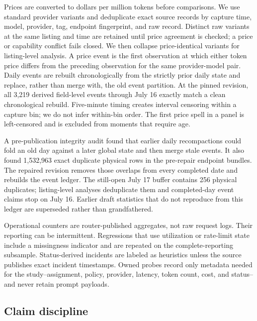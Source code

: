 \documentclass[11pt]{article}
\newcommand{\1}{\mathbf{1}}
\begin{document}
Prices are converted to dollars per million tokens before comparisons.  We use
standard provider variants and deduplicate exact source records by capture time,
model, provider, tag, endpoint fingerprint, and raw record.  Distinct raw variants
at the same listing and time are retained until price agreement is checked; a
price or capability conflict fails closed.  We then collapse price-identical
variants for listing-level analysis.  A price event is the first observation at
which either token price differs from the preceding observation for the same
provider-model pair.  Daily events are rebuilt chronologically from the strictly
prior daily state and replace, rather than merge with, the old event partition.
At the pinned revision, all 3,219 derived field-level events through July 16
exactly match a clean chronological rebuild.  Five-minute timing creates interval
censoring within a capture bin; we do not infer within-bin order.  The first price
spell in a panel is left-censored and is excluded from moments that require age.

A pre-publication integrity audit found that earlier daily recompactions could
fold an old day against a later global state and then merge stale events.  It also
found 1,532,963 exact duplicate physical rows in the pre-repair endpoint bundles.
The repaired revision removes those overlaps from every completed date and
rebuilds the event ledger.  The still-open July 17 buffer contains 256 physical
duplicates; listing-level analyses deduplicate them and completed-day event
claims stop on July 16.  Earlier draft statistics that do not reproduce from this
ledger are superseded rather than grandfathered.

Operational counters are router-published aggregates, not raw request logs.
Their reporting can be intermittent.  Regressions that use utilization or
rate-limit state include a missingness indicator and are repeated on the
complete-reporting subsample.  Status-derived incidents are labeled as heuristics
unless the source publishes exact incident timestamps.  Owned probes record only
metadata needed for the study--assignment, policy, provider, latency, token count,
cost, and status--and never retain prompt payloads.

\subsection{Claim discipline}
\end{document}
